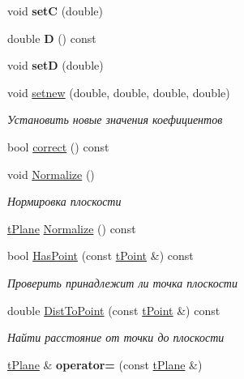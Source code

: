 \begin{DoxyCompactItemize}
\item 
\mbox{\label{classtPlane_a4ad41ca722a6da81d3758631f67db13b}} 
void {\bfseries setC} (double)
\item 
\mbox{\label{classtPlane_a962da3f8ce1289d44438ad8f7ffbbbfa}} 
double {\bfseries D} () const
\item 
\mbox{\label{classtPlane_aab58e6aa9e9e941a12d2aa5dd85cbc8c}} 
void {\bfseries setD} (double)
\item 
\mbox{\label{classtPlane_a21e7cda32a0a6111f92cb8102915d304}} 
void \hyperlink{classtPlane_a21e7cda32a0a6111f92cb8102915d304}{setnew} (double, double, double, double)
\begin{DoxyCompactList}\small\item\em Установить новые значения коефициентов \end{DoxyCompactList}\item 
bool \hyperlink{classtPlane_a382974c179a2bac3eb2da1d18c4dd860}{correct} () const
\item 
\mbox{\label{classtPlane_a7891a14a7511d7526633be820ce1604d}} 
void \hyperlink{classtPlane_a7891a14a7511d7526633be820ce1604d}{Normalize} ()
\begin{DoxyCompactList}\small\item\em Нормировка плоскости \end{DoxyCompactList}\item 
\hyperlink{classtPlane}{t\+Plane} \hyperlink{classtPlane_a8957e329f01270932a9a5b73ee9fe33a}{Normalize} () const
\item 
\mbox{\label{classtPlane_a90727fd4cebd6ddb9a82482ad89a9edd}} 
bool \hyperlink{classtPlane_a90727fd4cebd6ddb9a82482ad89a9edd}{Has\+Point} (const \hyperlink{classtPoint}{t\+Point} \&) const
\begin{DoxyCompactList}\small\item\em Проверить принадлежит ли точка плоскости \end{DoxyCompactList}\item 
\mbox{\label{classtPlane_a08f5fac758dd76797e3571c76ec7b3fa}} 
double \hyperlink{classtPlane_a08f5fac758dd76797e3571c76ec7b3fa}{Dist\+To\+Point} (const \hyperlink{classtPoint}{t\+Point} \&) const
\begin{DoxyCompactList}\small\item\em Найти расстояние от точки до плоскости \end{DoxyCompactList}\item 
\mbox{\label{classtPlane_a90739f10ab1734192c38128f8b267c7f}} 
\hyperlink{classtPlane}{t\+Plane} \& {\bfseries operator=} (const \hyperlink{classtPlane}{t\+Plane} \&)
\end{DoxyCompactItemize}
